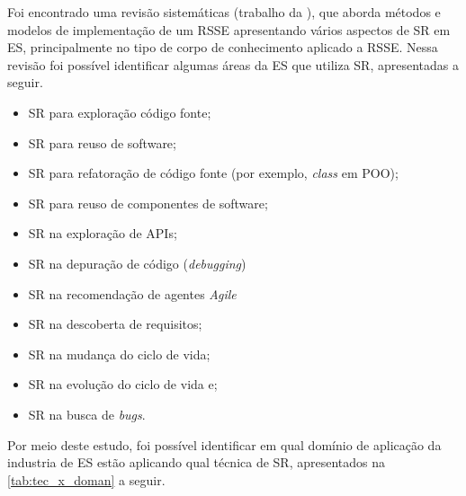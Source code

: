 Foi encontrado uma revisão sistemáticas (trabalho da \citealp{maki2016systematic}), que aborda métodos e modelos de implementação de um RSSE apresentando vários aspectos de SR em ES, principalmente no tipo de corpo de conhecimento aplicado a RSSE. Nessa revisão foi possível identificar algumas áreas da ES que utiliza SR, apresentadas a seguir.

\begin{itemize}
	\item SR para exploração código fonte;
	\item SR para reuso de software;
	\item SR para refatoração de código fonte (por exemplo, \textit{class} em POO);
	\item SR para reuso de componentes de software;
	\item SR na exploração de APIs;
	\item SR na depuração de código (\textit{debugging})
	\item SR na recomendação de agentes \textit{Agile}
	\item SR na descoberta de requisitos;
	\item SR na mudança do ciclo de vida;
	\item SR na evolução do ciclo de vida e;
	\item SR na busca de \textit{bugs}.
\end{itemize}

Por meio deste estudo, foi possível identificar em qual domínio de aplicação da industria de ES estão aplicando qual técnica de SR, apresentados na \ref{tab:tec_x_doman} a seguir.

